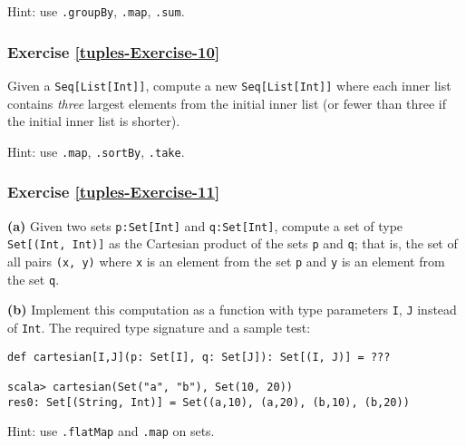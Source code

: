 Hint: use \lstinline!.groupBy!, \lstinline!.map!, \lstinline!.sum!.

\subsubsection{Exercise \label{tuples-Exercise-10}\ref{tuples-Exercise-10}}

Given a \lstinline!Seq[List[Int]]!, compute a new \lstinline!Seq[List[Int]]!
where each inner list contains \emph{three} largest elements from
the initial inner list (or fewer than three if the initial inner list
is shorter).

Hint: use \lstinline!.map!, \lstinline!.sortBy!, \lstinline!.take!.%
\begin{comment}
Solution:
\begin{lstlisting}
numsLists.map(_.sortBy(-_).take(3))
\end{lstlisting}
\end{comment}


\subsubsection{Exercise \label{tuples-Exercise-11}\ref{tuples-Exercise-11}}

\textbf{(a)} Given two sets \lstinline!p:Set[Int]! and \lstinline!q:Set[Int]!,
compute a set of type \lstinline!Set[(Int, Int)]! as the Cartesian
product of the sets \lstinline!p! and \lstinline!q!; that is, the
set of all pairs \lstinline!(x, y)! where \lstinline!x! is an element
from the set \lstinline!p! and \lstinline!y! is an element from
the set \lstinline!q!. 

\textbf{(b)} Implement this computation as a function with type parameters
\lstinline!I!, \lstinline!J! instead of \lstinline!Int!. The required
type signature and a sample test:
\begin{lstlisting}
def cartesian[I,J](p: Set[I], q: Set[J]): Set[(I, J)] = ???

scala> cartesian(Set("a", "b"), Set(10, 20))
res0: Set[(String, Int)] = Set((a,10), (a,20), (b,10), (b,20))
\end{lstlisting}

Hint: use \lstinline!.flatMap! and \lstinline!.map! on sets.%
\begin{comment}
Solution:
\begin{lstlisting}
a.flatMap(x => b.map(y => (x, y)))
\end{lstlisting}
\end{comment}


